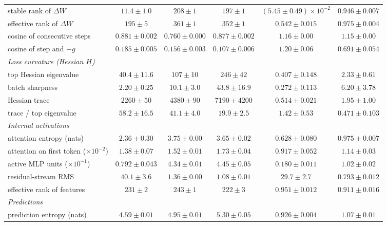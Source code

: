 \begin{center}
\begin{minipage}{\linewidth}
\begin{tabular}{@{}l|ccc|cc@{}}
stable rank of $\Delta W$ & $11.4 \pm 1.0$ & $208 \pm 1$ & $197 \pm 1$ & {\boldmath\textbf{$(5.45 \pm 0.49){\times}10^{-2}$}} & $0.946 \pm 0.007$ \\
effective rank of $\Delta W$ & $195 \pm 5$ & $361 \pm 1$ & $352 \pm 1$ & $0.542 \pm 0.015$ & $0.975 \pm 0.004$ \\
cosine of consecutive steps & $0.881 \pm 0.002$ & $0.760 \pm 0.000$ & $0.877 \pm 0.002$ & $1.16 \pm 0.00$ & $1.15 \pm 0.00$ \\
cosine of step and $-g$ & $0.185 \pm 0.005$ & $0.156 \pm 0.003$ & $0.107 \pm 0.006$ & $1.20 \pm 0.06$ & {\boldmath\textbf{$0.691 \pm 0.054$}} \\
\emph{Loss curvature (Hessian $H$)} & & & & & \\
top Hessian eigenvalue & $40.4 \pm 11.6$ & $107 \pm 10$ & $246 \pm 42$ & $0.407 \pm 0.148$ & {\boldmath\textbf{$2.33 \pm 0.61$}} \\
batch sharpness & $2.20 \pm 0.25$ & $10.1 \pm 3.0$ & $43.8 \pm 16.9$ & $0.272 \pm 0.113$ & {\boldmath\textbf{$6.20 \pm 3.78$}} \\
Hessian trace & $2260 \pm 50$ & $4380 \pm 90$ & $7190 \pm 4200$ & $0.514 \pm 0.021$ & $1.95 \pm 1.00$ \\
trace / top eigenvalue & $58.2 \pm 16.5$ & $41.1 \pm 4.0$ & $19.9 \pm 2.5$ & $1.42 \pm 0.53$ & {\boldmath\textbf{$0.471 \pm 0.103$}} \\
\emph{Internal activations} & & & & & \\
attention entropy (nats) & $2.36 \pm 0.30$ & $3.75 \pm 0.00$ & $3.65 \pm 0.02$ & $0.628 \pm 0.080$ & $0.975 \pm 0.007$ \\
attention on first token ($\times10^{-2}$) & $1.38 \pm 0.07$ & $1.52 \pm 0.01$ & $1.73 \pm 0.04$ & $0.917 \pm 0.052$ & $1.14 \pm 0.03$ \\
active MLP units ($\times10^{-1}$) & $0.792 \pm 0.043$ & $4.34 \pm 0.01$ & $4.45 \pm 0.05$ & {\boldmath\textbf{$0.180 \pm 0.011$}} & $1.02 \pm 0.02$ \\
residual-stream RMS & $40.1 \pm 3.6$ & $1.36 \pm 0.00$ & $1.08 \pm 0.01$ & {\boldmath\textbf{$29.7 \pm 2.7$}} & {\boldmath\textbf{$0.793 \pm 0.012$}} \\
effective rank of features & $231 \pm 2$ & $243 \pm 1$ & $222 \pm 3$ & $0.951 \pm 0.012$ & $0.911 \pm 0.016$ \\
\emph{Predictions} & & & & & \\
prediction entropy (nats) & $4.59 \pm 0.01$ & $4.95 \pm 0.01$ & $5.30 \pm 0.05$ & $0.926 \pm 0.004$ & $1.07 \pm 0.01$ \\

\end{tabular}
\end{minipage}
\end{center}
